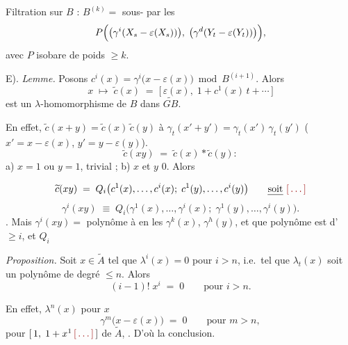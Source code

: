 \documentclass[11pt,a4paper]{article}
\begin{document}
Filtration sur $B$ :  $B^{(k)} =$ sous-\struck{\ill{}}
 \struck{\ill{}} par les
\[
  P\Bigl(\bigl(\gamma^{i}(X_{s} - \varepsilon(X_{s}))\bigr),\;
  \bigl(\gamma^{d}(Y_{t} - \varepsilon(Y_{t}))\bigr)\Bigr) ,
\]
avec $P$ \struck{\ill{}} isobare de poids $\geqslant k$.

\struck{\ill{}} E). \emph{Lemme.} Posons $c^{i}(x) = \gamma^{i}\bigl(x - \varepsilon(x)\bigr)
\bmod B^{(i+1)}$. Alors
\[
  x \;\longmapsto\; \widetilde{c}(x) \;=\;
  \bigl[\,\varepsilon(x),\; 1 + c^{1}(x)\,t + \cdots \,\bigr]
\]
est un $\lambda$-homomorphisme de $B$ dans $\widetilde{GB}$.

En effet, $\widetilde{c}(x+y) = \widetilde{c}(x)\,\widetilde{c}(y)$
  à
$\gamma_{t}(x' + y') = \gamma_{t}(x')\,\gamma_{t}(y')$ (
$x' = x - \varepsilon(x)$, $y' = y - \varepsilon(y)$). 
\[
  \widetilde{c}(xy) \;=\; \widetilde{c}(x) \ast \widetilde{c}(y) :
\]
a) $x = 1$ ou $y = 1$, trivial ; b) $x$ et $y$
 $0$. Alors

\[
  \widetilde{c}(xy) \;=\; Q_{i}\bigl(c^{1}(x), \ldots, c^{i}(x);\;
  c^{1}(y), \ldots, c^{i}(y)\bigr) \qquad \text{\uncertain{soit}} \ \ill{}
\]
\ill{}
\[
  \gamma^{i}(xy) \;\equiv\; Q_{i}\bigl(\gamma^{1}(x), \ldots, \gamma^{i}(x);\;
  \gamma^{1}(y), \ldots, \gamma^{i}(y)\bigr) .
\]
 \ill{} \ill{}. Mais $\gamma^{i}(xy) =$ polynôme à \ill{} en les
$\gamma^{k}(x)$, $\gamma^{h}(y)$, et \ill{} \ill{} \ill{} que \ill{} polynôme
est d'\emph{\ill{}} $\geqslant i$, et  
 \ill{} \ill{} \ill{} $Q_{i}$


\emph{Proposition.} Soit $x \in \widetilde{A}$ tel que  $\lambda^{i}(x) = 0$ pour $i > n$, i.e.\ tel que
$\lambda_{t}(x)$ soit un polynôme de degré $\leqslant n$. Alors
\struck{\ill{}}
\[
  (i-1)!\;x^{i} \;=\; 0 \qquad \text{pour } i > n .
\]

En effet, $\lambda^{n}(x)$ \ill{} \ill{} \ill{} pour \ill{} $x$ \ill{} \ill{}
\[
  \gamma^{m}\bigl(x - \varepsilon(x)\bigr) \;=\; 0 \qquad \text{pour } m > n ,
\]
pour $[\,1,\; 1 + x^{1}\,\ill{}\,]$ \struck{\ill{}} \ill{} \ill{}
\emph{\ill{}}  de $\widetilde{A}$,
\ill{}. D'où la conclusion.
\end{document}
